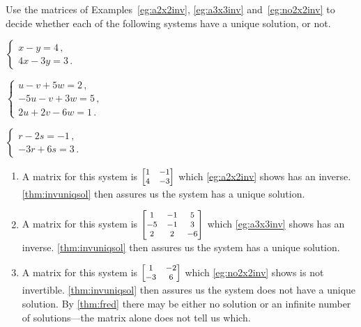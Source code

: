 \begin{example} \label{eg:}
Use the matrices of Examples~\ref{eg:a2x2inv}, \ref{eg:a3x3inv} and~\ref{eg:no2x2inv} to decide whether each of the following systems have a unique solution, or not.
\begin{parts}
\item \(\begin{cases}
x-y=4\,,\\4x-3y=3\,.
\end{cases}\)
\item \(\begin{cases}
u-v+5w=2\,,\\ -5u-v+3w=5\,,\\ 2u+2v-6w=1\,.
\end{cases}\)
\item \(\begin{cases}
r-2s=-1\,,\\-3r+6s=3\,.
\end{cases}\)
\end{parts}
\begin{solution} 
\begin{enumerate}
\item A matrix for this system is \(\footnotesize\begin{bmatrix} 1&-1\\4&-3 \end{bmatrix}\) which \autoref{eg:a2x2inv} shows has an inverse.  
\autoref{thm:invuniqsol} then assures us the system has a unique solution.
\item A matrix for this system is \(\footnotesize\begin{bmatrix} 1&-1&5\\-5&-1&3\\2&2&-6 \end{bmatrix}\) which \autoref{eg:a3x3inv} shows has an inverse.  
\autoref{thm:invuniqsol} then assures us the system has a unique solution.
\item A matrix for this system is \(\footnotesize\begin{bmatrix} 1&-2\\-3&6 \end{bmatrix}\) which \autoref{eg:no2x2inv} shows is not invertible.  
\autoref{thm:invuniqsol} then assures us the system does not have a unique solution.
By \autoref{thm:fred} there may be either no solution or an infinite number of solutions---the matrix alone does not tell us which.
\end{enumerate}
\end{solution}
\end{example}






